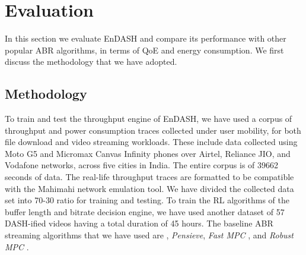 \section{\textbf{Evaluation}}\label{section:evaluation}

In this section we evaluate EnDASH and compare its performance with other popular \ac{ABR} algorithms, in terms of \ac{QoE} and energy consumption. We first discuss the methodology that we have adopted.
\subsection{Methodology}
To train and test the throughput engine of EnDASH, we have used a corpus of throughput and power consumption traces collected under user mobility, for both file download and video streaming workloads. These include data collected using Moto G5 and Micromax Canvas Infinity phones over Airtel, Reliance JIO, and Vodafone networks, across five cities in India. The entire corpus is of 39662 seconds of data. The real-life throughput traces are formatted to be compatible with the Mahimahi \cite{Netravali2015} network emulation tool. We have divided the collected data set into 70-30 ratio for training and testing. To train the RL algorithms of the buffer length and bitrate decision engine, we have used another  dataset of 57 DASH-ified videos having a total duration of 45 hours. 
The baseline \ac{ABR} streaming algorithms that we have used are  \cite{Spiteri2016}, \textit{Pensieve}\cite{mao2017neural}, \textit{Fast MPC} \cite{Yin2015}, and \textit{Robust MPC} \cite{Yin2015}. 
